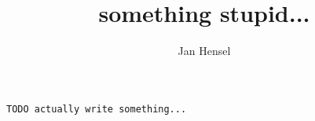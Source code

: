 \documentclass{article}
\author{Jan Hensel}
\title{something stupid...}
\newcommand{\re}[0]{\color{red}}
\newcommand{\todo}[1]{\texttt{\re TODO #1\\}}
\begin{document}
\maketitle
\todo{actually write something...}
\end{document}
